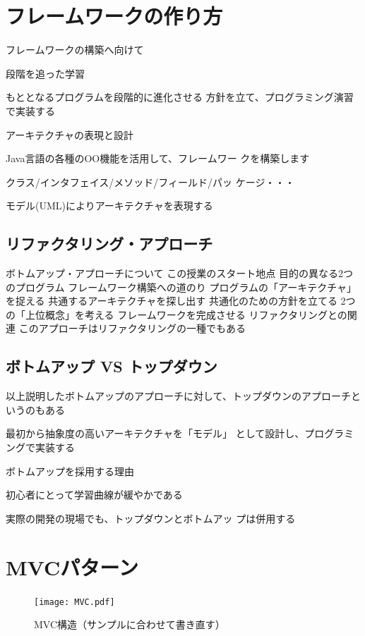 \documentclass[a4j, twoside]{jsbook}
\begin{document}
\section{フレームワークの作り方}
フレームワークの構築へ向けて

段階を追った学習

もととなるプログラムを段階的に進化させる
方針を立て、プログラミング演習で実装する

アーキテクチャの表現と設計

Java言語の各種のOO機能を活用して、フレームワー
クを構築します

クラス/インタフェイス/メソッド/フィールド/パッ
ケージ・・・

モデル(UML)によりアーキテクチャを表現する

\subsection{リファクタリング・アプローチ}

ボトムアップ・アプローチについて
この授業のスタート地点
 目的の異なる2つのプログラム
フレームワーク構築への道のり
 プログラムの「アーキテクチャ」を捉える
 共通するアーキテクチャを探し出す
 共通化のための方針を立てる
 2つの「上位概念」を考える
 フレームワークを完成させる
リファクタリングとの関連
 このアプローチはリファクタリングの一種でもある

\subsection{ボトムアップ VS トップダウン}

以上説明したボトムアップのアプローチに対して、トップダウンのアプローチというのもある

最初から抽象度の高いアーキテクチャを「モデル」
として設計し、プログラミングで実装する

ボトムアップを採用する理由

初心者にとって学習曲線が緩やかである

実際の開発の現場でも、トップダウンとボトムアッ
プは併用する

\section{MVCパターン}

\begin{figure}
 \begin{center}
  \texttt{[image: MVC.pdf]}
  \caption{MVC構造（サンプルに合わせて書き直す）}
 \end{center}
\end{figure}
\end{document}
